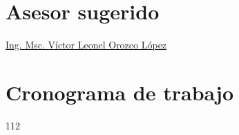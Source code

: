 \documentclass[letterpaper,12pt,titlepage]{report}
\begin{document}
\chapter{Asesor sugerido}

\href{http://vorozco.com/cv/index-es.html}{Ing.  Msc.  Víctor Leonel
  Orozco López}


\chapter{Cronograma de trabajo}
\begin {ganttchart}{1}{12}
\end {ganttchart}





{} 
\end{document}
